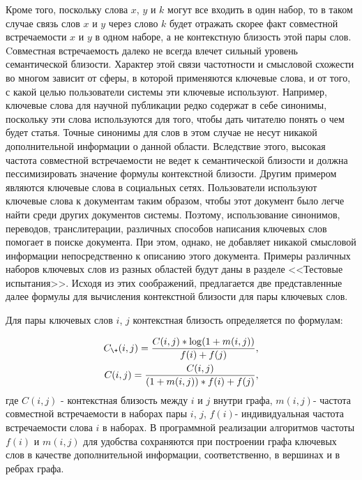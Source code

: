 Кроме того, поскольку слова $x$, $y$ и $k$ могут все входить в один набор, то в таком случае связь слов $x$ и $y$ через слово $k$ будет отражать скорее факт совместной встречаемости $x$ и $y$ в одном наборе, а не контекстную близость этой пары слов. Cовместная встречаемость далеко не всегда влечет сильный уровень семантической близости. Характер этой связи частотности и смысловой схожести во многом зависит от сферы, в которой применяются ключевые слова, и от того, с какой целью пользователи системы эти ключевые используют. Например, ключевые слова для научной публикации редко содержат в себе синонимы, поскольку эти слова используются для того, чтобы дать читателю понять о чем будет статья. Точные синонимы для слов в этом случае не несут никакой дополнительной информации о данной области. Вследствие этого, высокая частота совместной встречаемости не ведет к семантической близости и должна пессимизировать значение формулы контекстной близости. Другим примером являются ключевые слова в социальных сетях. Пользователи используют ключевые слова к документам таким образом, чтобы этот документ было легче найти среди других документов системы. Поэтому, использование синонимов, переводов, транслитерации, различных способов написания ключевых слов помогает в поиске документа. При этом, однако, не добавляет никакой смысловой информации непосредственно к описанию этого документа. Примеры различных наборов ключевых слов из разных областей будут даны в разделе <<Тестовые испытания>>. Исходя из этих соображений, предлагается две представленные далее формулы для вычисления контекстной близости для пары ключевых слов.

Для пары ключевых слов $i$, $j$ контекстная близость определяется по формулам:

\begin{equation}
    \begin{aligned}
       C_{\+}(i, j) = \frac{C(i, j) * \log(1 + m(i,j))}{f(i) + f(j)},\\
       C_{\-}(i, j) = \frac{C(i, j)}{(1 + m(i,j)) * f(i) + f(j)},
    \end{aligned}
\label{eq:test}
\end{equation}
где $C(i,j)$ - контекстная близость между $i$ и $j$ внутри графа, $m(i,j)$- частота совместной встречаемости в наборах пары $i$, $j$, $f(i)$- индивидуальная частота встречаемости слова $i$ в наборах. В программной реализации алгоритмов частоты $f(i)$ и $m(i,j)$ для удобства сохраняются при построении графа ключевых слов в качестве дополнительной информации, соответственно, в вершинах и в ребрах графа.

